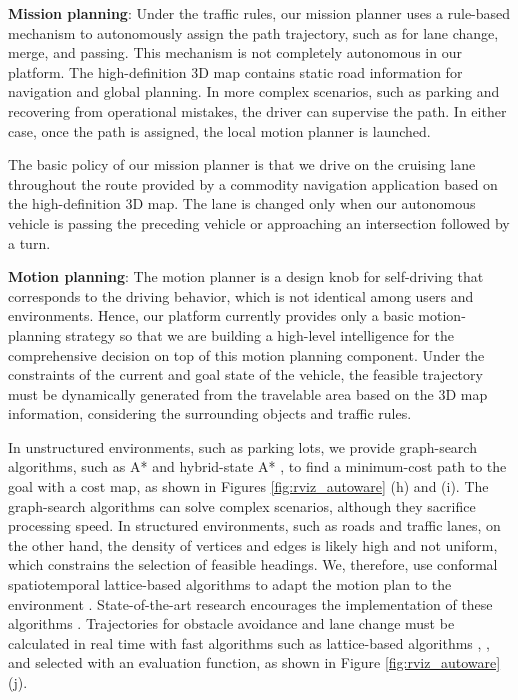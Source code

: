 \textbf{Mission planning}:
Under the traffic rules, our mission planner uses a rule-based mechanism to autonomously assign the path trajectory, such as for lane change, merge, and passing.
This mechanism is not completely autonomous in our platform.
The high-definition 3D map contains static road information for navigation and global planning.
In more complex scenarios, such as parking and recovering from operational mistakes, the driver can supervise the path.
In either case, once the path is assigned, the local motion planner is launched.

The basic policy of our mission planner is that we drive on the cruising lane throughout the route provided by a commodity navigation application based on the high-definition 3D map.
The lane is changed only when our autonomous vehicle is passing the preceding vehicle or approaching an intersection followed by a turn.

\textbf{Motion planning}:
The motion planner is a design knob for self-driving that corresponds to the driving behavior, which is not identical among users and environments.
Hence, our platform currently provides only a basic motion-planning strategy so that we are building a high-level intelligence for the comprehensive decision on top of this motion planning component.
Under the constraints of the current and goal state of the vehicle, the feasible trajectory must be dynamically  generated from the travelable area based on the 3D map information, considering the surrounding objects and traffic rules.

In unstructured environments, such as parking lots, we provide graph-search algorithms, such as A* \cite{hart1968formal} and hybrid-state A* \cite{dolgov2010path}, to find a minimum-cost path to the goal with a cost map, as shown in Figures \ref{fig:rviz_autoware} (h) and (i).
The graph-search algorithms can solve complex scenarios, although they sacrifice processing speed.
In structured environments, such as roads and traffic lanes, on the other hand, the density of vertices and edges is likely high and not uniform, which constrains the selection of feasible headings.
We, therefore, use conformal spatiotemporal lattice-based algorithms to adapt the motion plan to the environment \cite{mcnaughton2011motion}.
State-of-the-art research encourages the implementation of these algorithms \cite{urmson2008autonomous}.
Trajectories for obstacle avoidance and lane change must be calculated in real time with fast algorithms such as lattice-based algorithms \cite{pivtoraiko2009differentially}, \cite{mcnaughton2011motion}, and selected with an evaluation function, as shown in Figure \ref{fig:rviz_autoware} (j).

